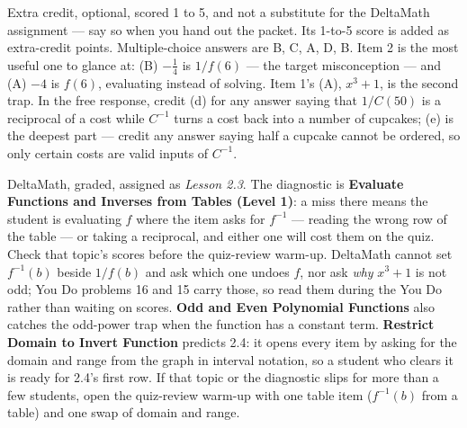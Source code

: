 \documentclass[10pt]{article}
\begin{document}
\begin{teachernote}[AP Practice]
Extra credit, optional, scored 1 to 5, and not a substitute for the DeltaMath assignment --- say so when you
hand out the packet. Its 1-to-5 score is added as extra-credit points. Multiple-choice answers are B, C, A, D,
B. Item 2 is the most useful one to glance at: (B) $-\frac{1}{4}$ is $1/f(6)$ --- the target
misconception --- and (A) $-4$ is $f(6)$, evaluating instead of solving. Item 1's (A),
$x^3 + 1$, is the second trap. In the free response, credit (d) for any answer saying that
$1/C(50)$ is a reciprocal of a cost while $C^{-1}$ turns a cost back into a number of
cupcakes; (e) is the deepest part --- credit any answer saying half a cupcake cannot be
ordered, so only certain costs are valid inputs of $C^{-1}$.
\end{teachernote}

\begin{teachernote}[Homework]
DeltaMath, graded, assigned as \textit{Lesson 2.3}. The diagnostic is \textbf{Evaluate
Functions and Inverses from Tables (Level 1)}: a miss there means the student is evaluating $f$ where
the item asks for $f^{-1}$ --- reading the wrong row of the table --- or taking a reciprocal,
and either one will cost them on the quiz. Check that topic's scores before the quiz-review
warm-up. DeltaMath cannot set $f^{-1}(b)$ beside $1/f(b)$ and ask which one undoes $f$, nor
ask \textit{why} $x^3 + 1$ is not odd; You Do problems 16 and 15 carry those, so read them
during the You Do rather than waiting on scores. \textbf{Odd and Even Polynomial Functions}
also catches the odd-power trap when the function has a constant term. \textbf{Restrict Domain
to Invert Function} predicts 2.4: it opens every item by asking for the domain and range from
the graph in interval notation, so a student who clears it is ready for 2.4's first row. If that topic or the diagnostic slips
for more than a few students, open the quiz-review warm-up with one table item ($f^{-1}(b)$
from a table) and one swap of domain and range.
\end{teachernote}
\end{document}
